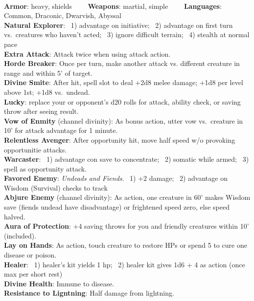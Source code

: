 \documentclass[11pt]{article}
\newcommand{\heading}[1]{{\sc\bfseries #1}}
\begin{document}
{\mbox{ }\\[4pt]
%
\heading{Armor}: heavy, shields
\ \ \ \
\heading{Weapons}: martial, simple
\ \ \ \
\heading{Languages}:  Common, Draconic, Dwarvish, Abyssal
\\[8pt]
%
\heading{Natural Explorer}:
\ 1) advantage on initiative;
\ 2) advantage on first turn vs.\ creatures who haven't acted;
\ 3) ignore difficult terrain;
\ 4) stealth at normal pace
\\[4pt]
\heading{Extra Attack}: Attack twice when using attack action.
\\[4pt]
\heading{Horde Breaker}: Once per turn, make another attack vs. different creature in range and within 5' of target.
\\[4pt]
\heading{Divine Smite}: After hit, spell slot to deal +2d8 melee damage; +1d8 per level above 1st; +1d8 vs.\ undead.
\\[4pt]
\heading{Lucky}: replace your or opponent's d20 rolls for attack, ability check, or saving throw after seeing result.
\\[4pt]
\heading{Vow of Enmity} (channel divinity): As bonus action, utter vow vs.\ creature in 10' for attack advantage for 1 minute.
\\[4pt]
\heading{Relentless Avenger}: After opportunity hit, move half speed w/o provoking opportunitie attacks.
\\[4pt]
\heading{Warcaster}:
\ 1) advantage con save to concentrate;
\ 2) somatic while armed;
\ 3) spell as opportunity attack.
\\[4pt]
\heading{Favored Enemy}: {\it Undeads and Fiends}.
\ 1) +2 damage;
\ 2) advantage on Wisdom (Survival) checks to track
\\[4pt]
\heading{Abjure Enemy} (channel divinity): As action, one creature in 60' makes Wisdom save (fiends undead have disadvantage) or frightened speed zero, else speed halved.
\\[8pt]
%
\heading{Aura of Protection}: +4 saving throws for you and friendly creatures within 10' (included).
\\[4pt]
\heading{Lay on Hands}: As action, touch creature to restore HPs or spend 5 to cure one disease or poison.
\\[4pt]
\heading{Healer}:
\ 1) healer's kit yields 1 hp;
\ 2) healer kit gives 1d6 + 4 as action (once max per short rest)
\\[4pt]
\heading{Divine Health}: Immune to disease.
\\[4pt]
\heading{Resistance to Ligntning}: Half damage from lightning.
\\[8pt]
}
\end{document}
